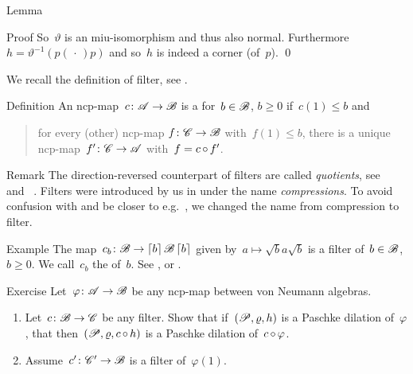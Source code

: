 \begin{parsec}
\begin{point}{Lemma}
\begin{point}{Proof}
So~$\vartheta$ is an miu-isomorphism and thus also normal.
    Furthermore~$h = \vartheta^{-1}(p (\,\cdot\,) p)$
     and so~$h$ is indeed a corner (of~$p$). \qed
\end{point}
\end{point}
\begin{point}%
We recall the definition of filter, see . 
\end{point}
\begin{point}{Definition}%
An ncp-map~$c \colon \mathscr{A} \to \mathscr{B}$
is a  for~$b \in\mathscr{B}$, $b \geq 0$ if~$c(1)\leq b$
    and
    \begin{quote}
        for every (other) ncp-map $f\colon \mathscr{C} \to \mathscr{B}$
            with~$f(1) \leq b$,
            there is a unique ncp-map~$f'\colon \mathscr{C} \to \mathscr{A}$
            with~$f = c \mathop{\circ} f'$.
    \end{quote}
\begin{point}{Remark}%
The direction-reversed counterpart
    of filters are called \emph{quotients},
    see~ and~\cite{effintro} .
Filters were introduced by us in \cite[Dfn.~2]{westerbaan2016universal}
    under the name \emph{compressions}.
To avoid confusion with \cite{alfsen2012}
    and be closer to e.g.~\cite{wilce2016royal},
    we changed the name from compression to filter.
\end{point}
\end{point}
\begin{point}{Example}%
    The map~$c_b\colon \mathscr{B} \to \left\lceil b\right\rceil \mathscr{B} \left\lceil b\right\rceil$
        given by~$a \mapsto \sqrt{b} a \sqrt{b}$ is a filter
        of~$b\in \mathscr{B}$, $b\geq 0$.
        We call~$c_b$ the  of~$b$.
    See , 
        or \cite[Prop.~6]{westerbaan2016universal}.
\end{point}
\begin{point}{Exercise}%
Let~$\varphi\colon \mathscr{A} \to \mathscr{B}$ be any ncp-map
    between von Neumann algebras.
\begin{enumerate}
\item
    Let~$c \colon \mathscr{B} \to \mathscr{C}$ be any filter.
    Show that if~$(\mathscr{P}, \varrho, h)$ is a Paschke dilation
            of~$\varphi$,
    that then~$(\mathscr{P}, \varrho, c \mathop{\circ} h)$ is a Paschke dilation
        of~$c \mathop{\circ} \varphi$.
\item
    Assume~$c'\colon \mathscr{C}' \to \mathscr{B}$ is a filter of~$\varphi(1)$.

\end{enumerate}
\end{point}
\end{parsec}
